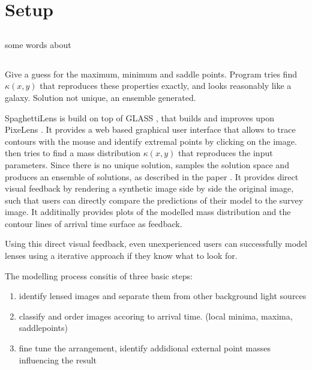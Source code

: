 \section {Setup} \label{sec:setup}

\subsection{\sw} \label{sec:SpaceWarps}
some words about \sw

\subsection{\spl} \label{sec:SpaghettiLens}

Give a guess for the maximum, minimum and saddle points.  Program
tries find $\kappa(x,y)$ that reproduces these properties exactly, and
looks reasonably like a galaxy.  Solution not unique, an ensemble
generated.

\hr

SpaghettiLens is build on top of GLASS \citep{Lubini2012}, that builds and improves upon PixeLens \citep{Saha2004}.
It provides a web based graphical user interface that allows to trace contours with the mouse and identify extremal points by clicking on the image.
\spl then tries to find a mass distribution $\kappa(x,y)$ that reproduces the input parameters.
Since there is no unique solution, \spl samples the solution space and produces an ensemble of solutions, as described in the paper \citep{Lubini2012}.
It provides direct visual feedback by rendering a synthetic image side by side the original image, such that users can directly compare the predictions of their model to the survey image.
It additinally provides plots of the modelled mass distribution and the contour lines of arrival time surface as feedback. 

Using this direct visual feedback, even unexperienced users can successfully model lenses using a iterative approach if they know what to look for.

The modelling process consitis of three basic steps:

\begin{enumerate}
  \item identify lensed images and separate them from other background light sources
  \item classify and order images accoring to arrival time. (local minima, maxima, saddlepoints)
  \item fine tune the arrangement, identify addidional external point masses influencing the result
\end{enumerate}

